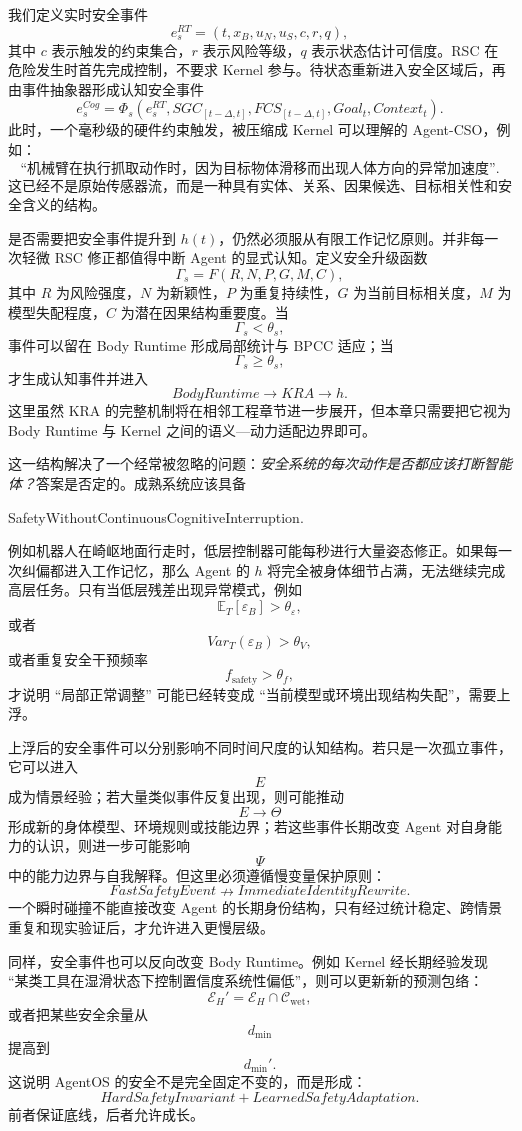 我们定义实时安全事件
\[
e_s^{RT}
=
(
t,
x_B,
u_N,
u_S,
c,
r,
q
),
\]
其中 $c$ 表示触发的约束集合，$r$ 表示风险等级，$q$ 表示状态估计可信度。RSC 在危险发生时首先完成控制，不要求 Kernel 参与。待状态重新进入安全区域后，再由事件抽象器形成认知安全事件
\[
e_s^{Cog}
=
\Phi_s
(
e_s^{RT},
SGC_{[t-\Delta,t]},
FCS_{[t-\Delta,t]},
Goal_t,
Context_t
).
\]
此时，一个毫秒级的硬件约束触发，被压缩成 Kernel 可以理解的 Agent-CSO，例如：
\[
\text{``机械臂在执行抓取动作时，因为目标物体滑移而出现人体方向的异常加速度''}.
\]
这已经不是原始传感器流，而是一种具有实体、关系、因果候选、目标相关性和安全含义的结构。

是否需要把安全事件提升到 $h(t)$，仍然必须服从有限工作记忆原则。并非每一次轻微 RSC 修正都值得中断 Agent 的显式认知。定义安全升级函数
\[
\Gamma_s
=
F(
R,
N,
P,
G,
M,
C
),
\]
其中 $R$ 为风险强度，$N$ 为新颖性，$P$ 为重复持续性，$G$ 为当前目标相关度，$M$ 为模型失配程度，$C$ 为潜在因果结构重要度。当
\[
\Gamma_s<\theta_s,
\]
事件可以留在 Body Runtime 形成局部统计与 BPCC 适应；当
\[
\Gamma_s\geq\theta_s,
\]
才生成认知事件并进入
\[
BodyRuntime
\rightarrow
KRA
\rightarrow
h.
\]
这里虽然 KRA 的完整机制将在相邻工程章节进一步展开，但本章只需要把它视为 Body Runtime 与 Kernel 之间的语义—动力适配边界即可。

这一结构解决了一个经常被忽略的问题：\emph{安全系统的每次动作是否都应该打断智能体？}答案是否定的。成熟系统应该具备
\begin{statementbox}
SafetyWithoutContinuousCognitiveInterruption.
\end{statementbox}
例如机器人在崎岖地面行走时，低层控制器可能每秒进行大量姿态修正。如果每一次纠偏都进入工作记忆，那么 Agent 的 $h$ 将完全被身体细节占满，无法继续完成高层任务。只有当低层残差出现异常模式，例如
\[
\mathbb E_T[\varepsilon_B]
>
\theta_\varepsilon,
\]
或者
\[
Var_T(\varepsilon_B)
>
\theta_V,
\]
或者重复安全干预频率
\[
f_{\mathrm{safety}}
>
\theta_f,
\]
才说明 ``局部正常调整'' 可能已经转变成 ``当前模型或环境出现结构失配''，需要上浮。

上浮后的安全事件可以分别影响不同时间尺度的认知结构。若只是一次孤立事件，它可以进入
\[
E
\]
成为情景经验；若大量类似事件反复出现，则可能推动
\[
E\rightarrow\Theta
\]
形成新的身体模型、环境规则或技能边界；若这些事件长期改变 Agent 对自身能力的认识，则进一步可能影响
\[
\Psi
\]
中的能力边界与自我解释。但这里必须遵循慢变量保护原则：
\[
FastSafetyEvent
\nrightarrow
ImmediateIdentityRewrite.
\]
一个瞬时碰撞不能直接改变 Agent 的长期身份结构，只有经过统计稳定、跨情景重复和现实验证后，才允许进入更慢层级。

同样，安全事件也可以反向改变 Body Runtime。例如 Kernel 经长期经验发现 ``某类工具在湿滑状态下控制置信度系统性偏低''，则可以更新新的预测包络：
\[
\mathcal E_H'
=
\mathcal E_H
\cap
\mathcal C_{\mathrm{wet}},
\]
或者把某些安全余量从
\[
d_{\min}
\]
提高到
\[
d_{\min}'.
\]
这说明 AgentOS 的安全不是完全固定不变的，而是形成：
\[
\boxed{
HardSafetyInvariant
+
LearnedSafetyAdaptation.
}
\]
前者保证底线，后者允许成长。

